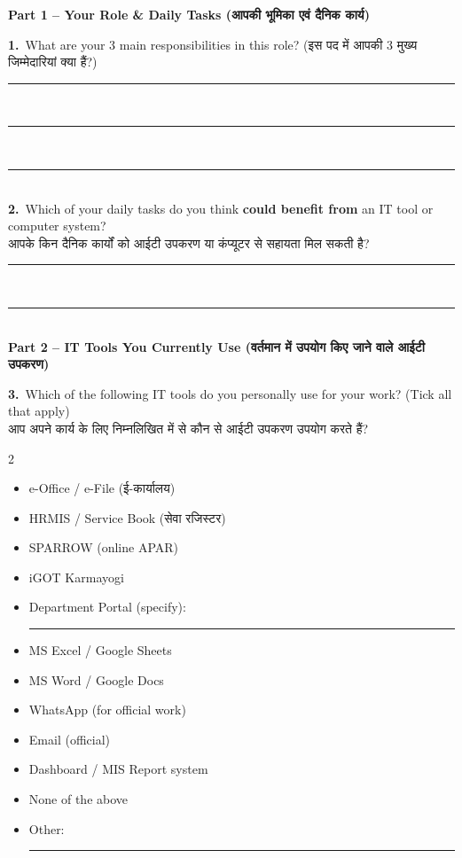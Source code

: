 \documentclass[11pt,a4paper]{article}
\newcommand{\hindi}[1]{{\hindifont #1}}
\newcommand{\q}[2]{%
  \vspace{4pt}
  \noindent\textbf{#1.}~#2\\[2pt]
}
\newcommand{\ans}{%
  \noindent\rule{\textwidth}{0.3pt}\\[3pt]
}
\newcommand{\choices}[1]{%
  \begin{itemize}[label=$\square$, leftmargin=1.4em, itemsep=1pt, topsep=2pt]
    #1
  \end{itemize}
}
\begin{document}
\begin{tcolorbox}[colback=streama,colframe=govblue,arc=2mm,boxrule=0.6pt,
  title={\textbf{STREAM A -- For Department Officials \& Employees} \quad \small\hindi{(विभागीय अधिकारी एवं कर्मचारी)}},fonttitle=\normalsize]

\textbf{\color{govblue}Part 1 -- Your Role \& Daily Tasks \hindi{(आपकी भूमिका एवं दैनिक कार्य)}}
\vspace{4pt}

\q{1}{What are your 3 main responsibilities in this role? \hindi{(इस पद में आपकी 3 मुख्य जिम्मेदारियां क्या हैं?)}}
\ans\ans\ans

\q{2}{Which of your daily tasks do you think \textbf{could benefit from} an IT tool or computer system?\\
\hindi{आपके किन दैनिक कार्यों को आईटी उपकरण या कंप्यूटर से सहायता मिल सकती है?}}
\ans\ans

\vspace{4pt}
\textbf{\color{govblue}Part 2 -- IT Tools You Currently Use \hindi{(वर्तमान में उपयोग किए जाने वाले आईटी उपकरण)}}
\vspace{4pt}

\q{3}{Which of the following IT tools do you personally use for your work? (Tick all that apply)\\
\hindi{आप अपने कार्य के लिए निम्नलिखित में से कौन से आईटी उपकरण उपयोग करते हैं?}}
\begin{multicols}{2}
\choices{
  \item e-Office / e-File \hindi{(ई-कार्यालय)}
  \item HRMIS / Service Book \hindi{(सेवा रजिस्टर)}
  \item SPARROW (online APAR)
  \item iGOT Karmayogi
  \item Department Portal (specify): \rule{1.5cm}{0.3pt}
  \item MS Excel / Google Sheets
  \item MS Word / Google Docs
  \item WhatsApp (for official work)
  \item Email (official)
  \item Dashboard / MIS Report system
  \item None of the above
  \item Other: \rule{2cm}{0.3pt}
}
\end{multicols}


\end{tcolorbox}
\end{document}
